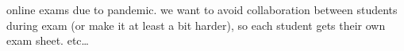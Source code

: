 online exams due to pandemic.
we want to avoid collaboration between students during exam (or make it at least a bit harder),
so each student gets their own exam sheet.
etc…

